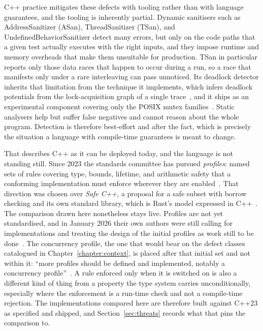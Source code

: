 \documentclass[english,twoside,openright,a4paper,censored,csm,software-track-2020]{HYthesisML}
\begin{document}
C++ practice mitigates these defects with tooling rather than with language guarantees, and
the tooling is inherently partial. Dynamic sanitisers such as AddressSanitizer (ASan),
ThreadSanitizer (TSan), and UndefinedBehaviorSanitizer detect many errors, but only on the
code paths that a given test actually executes with the right inputs, and they impose runtime
and memory overheads that make them unsuitable for production. TSan in particular reports only
those data races that happen to occur during a run, so a race that manifests only under a rare
interleaving can pass unnoticed. Its deadlock detector inherits that limitation from the technique
it implements, which infers deadlock potentials from the lock-acquisition graph of a single
trace~\cite{bensalem2005deadlock}, and it ships as an experimental component covering only the
POSIX mutex families~\cite{tsandeadlock}. Static analysers help but suffer false negatives and cannot
reason about the whole program. Detection is therefore best-effort and after the fact, which
is precisely the situation a language with compile-time guarantees is meant to change.

That describes C++ as it can be deployed today, and the language is not standing still. Since
2023 the standards committee has pursued \emph{profiles}: named sets of rules covering type,
bounds, lifetime, and arithmetic safety that a conforming implementation must enforce wherever
they are enabled~\cite{sutter2025profiles}. That direction was chosen over \emph{Safe C++}, a
proposal for a safe subset with borrow checking and its own standard library, which is Rust's
model expressed in C++~\cite{baxter2024safecpp}. The comparison drawn here nonetheless stays
live. Profiles are not yet standardised, and in January 2026 their own authors were still
calling for implementations and treating the design of the initial profiles as work still to be
done~\cite{vandevoorde2026profiles}. The concurrency profile, the one that would bear on the
defect classes catalogued in Chapter~\ref{chapter:context}, is placed after that initial set and
not within it: ``more profiles should be defined and implemented, notably a concurrency
profile''~\cite{vandevoorde2026profiles}. A rule enforced only when it is switched on is also a
different kind of thing from a property the type system carries unconditionally, especially
where the enforcement is a run-time check and not a compile-time rejection. The implementations
compared here are therefore built against C++23 as specified and shipped, and
Section~\ref{sec:threats} records what that pins the comparison to.
\end{document}
